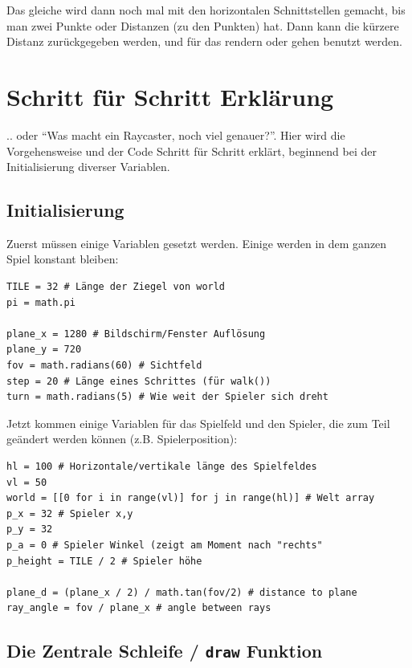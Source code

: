 \documentclass[a4paper,12pt]{report}
\begin{document}
Das gleiche wird dann noch mal mit den horizontalen Schnittstellen gemacht, bis man zwei Punkte oder Distanzen (zu den Punkten) hat. Dann kann die kürzere Distanz zurückgegeben werden, und für das rendern oder gehen benutzt werden.

\section{Schritt für Schritt Erklärung}

.. oder ``Was macht ein Raycaster, noch viel genauer?''. Hier wird die Vorgehensweise und der Code Schritt für Schritt erklärt, beginnend bei der Initialisierung diverser Variablen.

\subsection{Initialisierung}

Zuerst müssen einige Variablen gesetzt werden. Einige werden in dem ganzen Spiel konstant bleiben:
\begin{Verbatim}[baselinestretch=1.0, xleftmargin=1cm]
TILE = 32 # Länge der Ziegel von world
pi = math.pi

plane_x = 1280 # Bildschirm/Fenster Auflösung
plane_y = 720
fov = math.radians(60) # Sichtfeld
step = 20 # Länge eines Schrittes (für walk())
turn = math.radians(5) # Wie weit der Spieler sich dreht
\end{Verbatim}

Jetzt kommen einige Variablen für das Spielfeld und den Spieler, die zum Teil geändert werden können (z.B. Spielerposition):
\begin{Verbatim}[baselinestretch=1.0, xleftmargin=1cm]
hl = 100 # Horizontale/vertikale länge des Spielfeldes
vl = 50
world = [[0 for i in range(vl)] for j in range(hl)] # Welt array
p_x = 32 # Spieler x,y
p_y = 32
p_a = 0 # Spieler Winkel (zeigt am Moment nach "rechts"
p_height = TILE / 2 # Spieler höhe

plane_d = (plane_x / 2) / math.tan(fov/2) # distance to plane
ray_angle = fov / plane_x # angle between rays
\end{Verbatim}

\subsection{Die Zentrale Schleife / \texttt{draw} Funktion}
\end{document}
